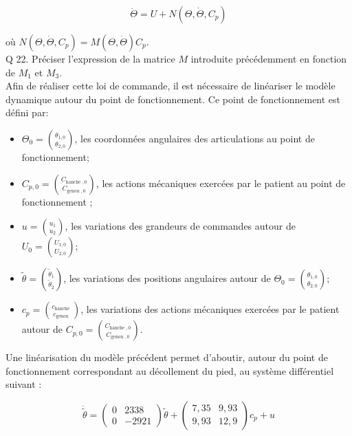 \documentclass[10pt]{article}
\begin{document}
$$
\ddot{\Theta}=U+N\left(\Theta, \dot{\Theta}, C_{p}\right)
$$

où $N\left(\Theta, \dot{\Theta}, C_{p}\right)=M(\Theta, \dot{\Theta}) C_{p}$.\\
Q 22. Préciser l'expression de la matrice $M$ introduite précédemment en fonction de $M_{1}$ et $M_{3}$.\\
Afin de réaliser cette loi de commande, il est nécessaire de linéariser le modèle dynamique autour du point de fonctionnement. Ce point de fonctionnement est défini par:

\begin{itemize}
  \item $\Theta_{0}=\binom{\theta_{1,0}}{\theta_{2,0}}$, les coordonnées angulaires des articulations au point de fonctionnement;
  \item $C_{p, 0}=\binom{C_{\text {hanche }, 0}}{C_{\text {genou }, 0}}$, les actions mécaniques exercées par le patient au point de fonctionnement ;
  \item $u=\binom{u_{1}}{u_{2}}$, les variations des grandeurs de commandes autour de $U_{0}=\binom{U_{1,0}}{U_{2,0}}$;
  \item $\tilde{\theta}=\binom{\tilde{\theta}_{1}}{\tilde{\theta}_{2}}$, les variations des positions angulaires autour de $\Theta_{0}=\binom{\theta_{1,0}}{\theta_{2,0}}$;
  \item $c_{p}=\binom{c_{\text {hanche }}}{c_{\text {genou }}}$, les variations des actions mécaniques exercées par le patient autour de $C_{p, 0}=\binom{C_{\text {hanche }, 0}}{C_{\text {genou }, 0}}$.
\end{itemize}

Une linéarisation du modèle précédent permet d'aboutir, autour du point de fonctionnement correspondant au décollement du pied, au système différentiel suivant :

$$
\ddot{\tilde{\theta}}=\left(\begin{array}{cc}
0 & 2338 \\
0 & -2921
\end{array}\right) \tilde{\theta}+\left(\begin{array}{cc}
7,35 & 9,93 \\
9,93 & 12,9
\end{array}\right) c_{p}+u
$$
\end{document}
